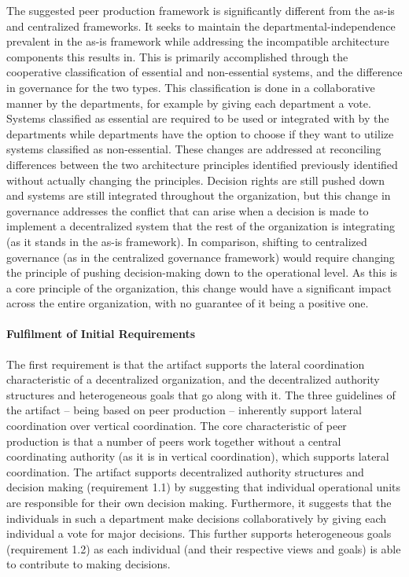 The suggested peer production framework is significantly different from the as-is and centralized frameworks. It seeks to maintain the departmental-independence prevalent in the as-is framework while addressing the incompatible architecture components this results in. This is primarily accomplished through the cooperative classification of essential and non-essential systems, and the difference in governance for the two types. This classification is done in a collaborative manner by the departments, for example by giving each department a vote. Systems classified as essential are required to be used or integrated with by the departments while departments have the option to choose if they want to utilize systems classified as non-essential. These changes are addressed at reconciling differences between the two architecture principles identified previously identified without actually changing the principles. Decision rights are still pushed down and systems are still integrated throughout the organization, but this change in governance addresses the conflict that can arise when a decision is made to implement a decentralized system that the rest of the organization is integrating (as it stands in the as-is framework). In comparison, shifting to centralized governance (as in the centralized governance framework) would require changing the principle of pushing decision-making down to the operational level. As this is a core principle of the organization, this change would have a significant impact across the entire organization, with no guarantee of it being a positive one. 

\paragraph*{Fulfilment of Initial Requirements}

The first requirement is that the artifact supports the lateral coordination characteristic of a decentralized organization, and the decentralized authority structures and heterogeneous goals that go along with it. The three guidelines of the artifact -- being based on peer production -- inherently support lateral coordination over vertical coordination. The core characteristic of peer production is that a number of peers work together without a central coordinating authority (as it is in vertical coordination), which supports lateral coordination. The artifact supports decentralized authority structures and decision making (requirement 1.1) by suggesting that individual operational units are responsible for their own decision making. Furthermore, it suggests that the individuals in such a department make decisions collaboratively by giving each individual a vote for major decisions. This further supports heterogeneous goals (requirement 1.2) as each individual (and their respective views and goals) is able to contribute to making decisions.

